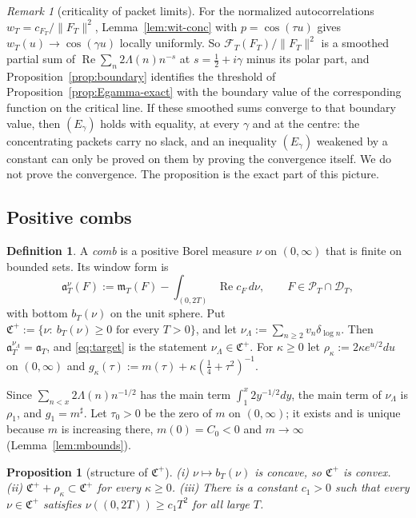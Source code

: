 \documentclass[11pt]{amsart}
\newtheorem{proposition}[theorem]{Proposition}
\theoremstyle{definition}
\newtheorem{definition}[theorem]{Definition}
\theoremstyle{remark}
\newtheorem{remark}[theorem]{Remark}
\newcommand{\Rel}{\operatorname{Re}}
\newcommand{\PT}{\mathcal P_T}
\newcommand{\cF}{c_F}
\newcommand{\mT}{\mathfrak m_T}
\begin{document}
\begin{remark}[criticality of packet limits]\label{rem:critical}
For the normalized autocorrelations $w_T=c_{F_T}/\|F_T\|^2$, Lemma~\ref{lem:wit-conc} with $p=\cos(\tau u)$ gives $w_T(u)\to\cos(\gamma u)$
locally uniformly. So $\mathcal F_T(F_T)/\|F_T\|^2$ is a smoothed partial sum of $\Rel\sum_n2\Lambda(n)n^{-s}$ at
$s=\frac12+i\gamma$ minus its polar part, and Proposition~\ref{prop:boundary} identifies the threshold of
Proposition~\ref{prop:Egamma-exact} with the boundary value of the corresponding function on the critical line. If these
smoothed sums converge to that boundary value, then $(E_\gamma)$ holds with equality, at every $\gamma$ and at the
centre: the concentrating packets carry no slack, and an inequality $(E_\gamma)$ weakened by a constant can only be
proved on them by proving the convergence itself. We do not prove the convergence. The proposition is the exact part
of this picture.
\end{remark}

\subsection{Positive combs}\label{subsec:poscombs}

\begin{definition}\label{def:comb}
A \emph{comb} is a positive Borel measure $\nu$ on $(0,\infty)$ that is finite on bounded sets. Its window form is
\[
\mathfrak a^\nu_T(F):=\mT(F)-\int_{(0,2T)}\Rel\cF\,d\nu,\qquad F\in\PT\cap\mathcal D_T,
\]
with bottom $b_T(\nu)$ on the unit sphere. Put $\mathfrak C^+:=\{\nu:\ b_T(\nu)\ge0\text{ for every }T>0\}$, and let
$\nu_\Lambda:=\sum_{n\ge2}v_n\delta_{\log n}$. Then $\mathfrak a^{\nu_\Lambda}_T=\mathfrak a_T$, and \eqref{eq:target} is the
statement $\nu_\Lambda\in\mathfrak C^+$. For $\kappa\ge0$ let $\rho_\kappa:=2\kappa e^{u/2}du$ on $(0,\infty)$ and
$g_\kappa(\tau):=m(\tau)+\kappa(\frac14+\tau^2)^{-1}$.
\end{definition}

Since $\sum_{n<x}2\Lambda(n)n^{-1/2}$ has the main term $\int_1^x2y^{-1/2}dy$, the main term of $\nu_\Lambda$ is $\rho_1$, and
$g_1=m^\sharp$. Let $\tau_0>0$ be the zero of $m$ on $(0,\infty)$; it exists and is unique because $m$ is increasing there,
$m(0)=C_0<0$ and $m\to\infty$ (Lemma~\ref{lem:mbounds}).

\begin{proposition}[structure of $\mathfrak C^+$]\label{prop:Cplus}
\emph{(i)} $\nu\mapsto b_T(\nu)$ is concave, so $\mathfrak C^+$ is convex.
\emph{(ii)} $\mathfrak C^++\rho_\kappa\subset\mathfrak C^+$ for every $\kappa\ge0$.
\emph{(iii)} There is a constant $c_1>0$ such that every $\nu\in\mathfrak C^+$ satisfies $\nu((0,2T))\ge c_1T^2$ for all large $T$.
\end{proposition}
\end{document}
